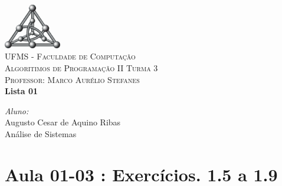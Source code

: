 \documentclass[a4paper,10pt]{article}
\begin{document}
\lstset{language=c,numbers=left,numberstyle=\tiny,breaklines=true,frame=single}

\begin{titlepage}

\begin{center}
\includegraphics[width=2.5cm]{facom_t}\\[0.5cm]
\textsc{UFMS - Faculdade de Computação}\\[0.25cm]
\textsc{\LARGE Algoritimos de Programação II Turma 3}\\[0.5cm]
\textsc{Professor: Marco Aurélio Stefanes}\\[2.5cm]
{ \huge \bfseries Lista 01 \\[0.4cm] }
\end{center}
\vspace{10cm}


\begin{minipage}{1.6\textwidth}
\begin{center}
\emph{Aluno:} \\
Augusto Cesar de Aquino Ribas\\
Análise de Sistemas\\
\end{center}
\end{minipage}%

\end{titlepage}

\newpage
\section{Aula 01-03 : Exercícios. 1.5 a 1.9}
\end{document}

